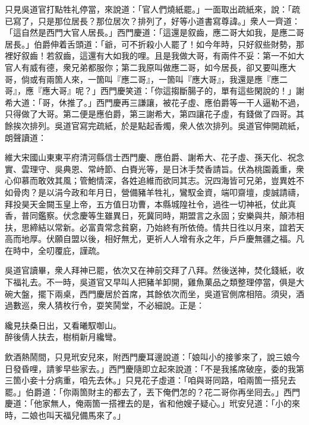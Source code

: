 只見吳道官打點牲礼停當，來說道：「官人們燒紙罷。」一面取出疏紙來，說：「疏已寫了，只是那位居長？那位居次？排列了，好等小道書寫尊諱。」衆人一齊道：「這自然是西門大官人居長。」{}西門慶道：「這還是叙齒，應二哥大如我，是應二哥居長。」伯爵伸着舌頭道：「爺，可不折殺小人罷了！{}如今年時，只好叙些財勢，那裡好叙齒！{}若叙齒，這還有大如我的哩。且是我做大哥，有兩件不妥：第一不如大官人有威有德，{}衆兄弟都服你；第二我原叫做應二哥，如今居長，卻又要叫應大哥，倘或有兩箇人來，一箇叫『應二哥』，一箇叫『應大哥』，我還是應『應二哥』，應『應大哥』呢？」西門慶笑道：「你這搊斷腸子的，單有這些閑說的！」謝希大道：「哥，休推了。」西門慶再三謙讓，被花子虛、應伯爵等一干人逼勒不過，只得做了大哥。第二便是應伯爵，第三謝希大，第四讓花子虛，有錢做了四哥。其餘挨次排列。吳道官寫完疏紙，於是點起香燭，衆人依次排列。吳道官伸開疏紙，朗聲讀道：

\begin{myquote}[\markfont]
維大宋國山東東平府清河縣信士西門慶、應伯爵、謝希大、花子虛、孫天化、祝念實、雲理守、吳典恩、常峙節、白賚光等，是日沐手焚香請旨。伏為桃園義重，衆心仰慕而敢效其風；管鮑情深，各姓追維而欲同其志。況四海皆可兄弟，豈異姓不如骨肉？是以涓今政和年月日，營備豬羊牲礼，鸞馭金資，端叩齋壇，虔誠請禱，拜投昊天金闕玉皇上帝，五方值日功曹，本縣城隍社令，過徃一切神衹，仗此真香，普同鑑察。伏念慶等生雖異日，死冀同時，期盟言之永固；安樂與共，顛沛相扶，思締結以常新。必富貴常念貧窮，乃始終有所依倚。情共日徃以月來，誼若天高而地厚。伏願自盟以後，相好無尤，更祈人人增有永之年，戶戶慶無疆之福。凡在時中，全叨覆庇，謹疏。

\end{myquote}

吳道官讀畢，衆人拜神已罷，依次又在神前交拜了八拜。然後送神，焚化錢紙，收下福礼去。不一時，吳道官又早叫人把豬羊卸開，雞魚菓品之類整理停當，俱是大碗大盤，擺下兩桌，西門慶居於首席，其餘依次而坐，吳道官側席相陪。須臾，酒過數巡，衆人猜枚行令，耍笑鬨堂，不必細說。正是：

\begin{myquote}
纔見扶桑日出，又看曦馭啣山。\\
醉後倩人扶去，樹梢新月纔彎。
\end{myquote}

飲酒熱鬧間，只見玳安兒來，附西門慶耳邊說道：「娘叫小的接爹來了，說三娘今日發昏哩，請爹早些家去。」西門慶隨即立起來說道：「不是我搖席破座，委的我第三箇小妾十分病重，咱先去休。」只見花子虛道：「咱與哥同路，咱兩箇一搭兒去罷。」伯爵道：「你兩箇財主的都去了，{}丟下俺們怎的？花二哥你再坐囘去。」西門慶道：「他家無人，俺兩箇一搭裡去的是，省和他嫂子疑心。」玳安兒道：「小的來時，二娘也叫天福兒備馬來了。」


